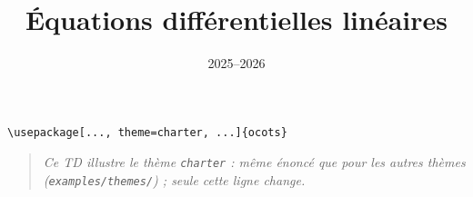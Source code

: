 \documentclass[11pt]{ocots-td}
\title{Équations différentielles linéaires}
\date{2025--2026}
\begin{document}
\maketitle

\begin{lstlisting}
\usepackage[..., theme=charter, ...]{ocots}
\end{lstlisting}
\begin{quote}\itshape
Ce TD illustre le th\`eme \texttt{charter} : m\^eme \'enonc\'e que pour les
autres th\`emes (\texttt{examples/themes/}) ; seule cette ligne change.
\end{quote}


\end{document}
